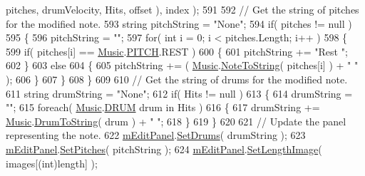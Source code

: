 \begin{DoxyCode}
      pitches, drumVelocity, Hits, offset ), index );
591 
592                 \textcolor{comment}{// Get the string of pitches for the modified note.}
593                 \textcolor{keywordtype}{string} pitchString = \textcolor{stringliteral}{"None"};
594                 \textcolor{keywordflow}{if}( pitches != null )
595                 \{
596                     pitchString = \textcolor{stringliteral}{""};
597                     \textcolor{keywordflow}{for}( \textcolor{keywordtype}{int} i = 0; i < pitches.Length; i++ )
598                     \{
599                         \textcolor{keywordflow}{if}( pitches[i] == \hyperlink{class_music}{Music}.\hyperlink{group___music_enums_ga508f69b199ea518f935486c990edac1d}{PITCH}.REST )
600                         \{
601                             pitchString += \textcolor{stringliteral}{"Rest "};
602                         \}
603                         \textcolor{keywordflow}{else}
604                         \{
605                             pitchString += ( \hyperlink{class_music}{Music}.\hyperlink{group___music_stat_func_ga85a22c905d56d4c5f4e62159bfecee8c}{NoteToString}( pitches[i] ) + \textcolor{stringliteral}{" "} );
606                         \}
607                     \}
608                 \}
609 
610                 \textcolor{comment}{// Get the string of drums for the modified note.}
611                 \textcolor{keywordtype}{string} drumString = \textcolor{stringliteral}{"None"};
612                 \textcolor{keywordflow}{if}( Hits != null )
613                 \{
614                     drumString = \textcolor{stringliteral}{""};
615                     \textcolor{keywordflow}{foreach}( \hyperlink{class_music}{Music}.\hyperlink{group___music_enums_gade475b4382c7066d1af13e7c13c029b6}{DRUM} drum in Hits )
616                     \{
617                         drumString += \hyperlink{class_music}{Music}.\hyperlink{group___music_stat_func_gaf5f64ebe9a7e036e07f283e41f26d22b}{DrumToString}( drum ) + \textcolor{stringliteral}{" "};
618                     \}
619                 \}
620 
621                 \textcolor{comment}{// Update the panel representing the note.}
622                 \hyperlink{group___s_c_m_priv_var_gad063b650cf7112be19edaf1a2033ea4d}{mEditPanel}.\hyperlink{group___s_c___n_d_p_unity_gae14b5564be204df7699b95186d83f69f}{SetDrums}( drumString );
623                 \hyperlink{group___s_c_m_priv_var_gad063b650cf7112be19edaf1a2033ea4d}{mEditPanel}.\hyperlink{group___s_c___n_d_p_unity_gad9bf776f0c51cf6170faccf9fc4ac7e0}{SetPitches}( pitchString );
624                 \hyperlink{group___s_c_m_priv_var_gad063b650cf7112be19edaf1a2033ea4d}{mEditPanel}.\hyperlink{group___s_c___n_d_p_unity_ga1a1c4b8111463ec3e134d17fe5064a54}{SetLengthImage}( images[(\textcolor{keywordtype}{int})length] );

\end{DoxyCode}
